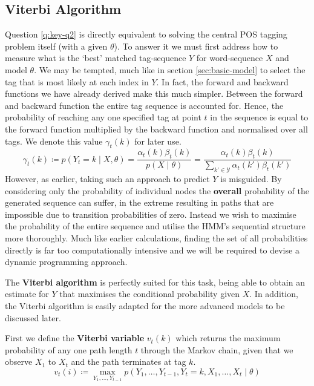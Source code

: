 \documentclass[../main.tex]{subfiles}
\begin{document}
\subsection{Viterbi Algorithm}

Question \ref{q:key-q2} is directly equivalent to solving the central POS tagging problem itself (with a given $\theta$).
To answer it we must first address how to measure what is the `best' matched tag-sequence $Y$ for word-sequence $X$ and model $\theta$.
We may be tempted, much like in section \ref{sec:basic-model} to select the tag that is most likely at each index in $Y$.
In fact, the forward and backward functions we have already derived make this much simpler.
Between the forward and backward function the entire tag sequence is accounted for.
Hence, the probability of reaching any one specified tag at point $t$ in the sequence is equal to the forward function multiplied by the backward function and normalised over all tags. We denote this value $\gamma_t(k)$ for later use.
\begin{equation*}
\gamma_t(k) \coloneqq p (Y_t = k \mid X, \theta) = \frac{\alpha_t(k)\beta_t(k)}{p(X \mid \theta)} = \frac{\alpha_t(k)\beta_t(k)}{\sum_{k' \in \mathcal{Y}}\alpha_t(k') \beta_t(k')}
\end{equation*}
However, as earlier, taking such an approach to predict $Y$ is misguided.
By considering only the probability of individual nodes the \textbf{overall} probability of the generated sequence can suffer, in the extreme resulting in paths that are impossible due to transition probabilities of zero.
Instead we wish to maximise the probability of the entire sequence and utilise the HMM's sequential structure more thoroughly.
Much like earlier calculations, finding the set of all probabilities directly is far too computationally intensive and we will be required to devise a dynamic programming approach.

The \textbf{Viterbi algorithm} \autocite{viterbi-1967} is perfectly suited for this task, being able to obtain an estimate for $Y$ that maximises the conditional probability given $X$.
In addition, the Viterbi algorithm is easily adapted for the more advanced models to be discussed later.

First we define the \textbf{Viterbi variable} $v_t(k)$ which returns the maximum probability of any one path length $t$ through the Markov chain, given that we observe $X_1$ to $X_t$ and the path terminates at tag $k$.
\begin{equation*}\label{eq:viterbi-var}
    v_t(i) \coloneqq \max_{Y_1, \ldots, Y_{t-1}} p(Y_1, \ldots, Y_{t-1}, Y_t = k, X_1, \ldots, X_t \mid \theta)
\end{equation*}
\end{document}
